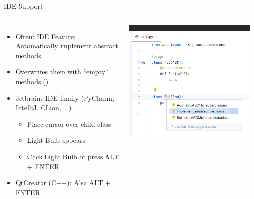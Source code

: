 \begin{frame}{IDE Support}
%
\begin{columns}
\begin{itemize}
\item Often: IDE Feature: Automatically implement abstract methods
\item Overwrites them with \enquote{empty} methods (\thus {})
\item Jetbrains IDE family (PyCharm, IntelliJ, CLion, ...)
	\begin{itemize}
	\item Place cursor over child class
	\item Light Bulb appears
	\item Click Light Bulb or press ALT + ENTER
	\end{itemize}
\item QtCreator (C++): Also ALT + ENTER
\end{itemize}
%
\includegraphics[width=\linewidth]{./gfx/15-IDE_ImplementAbstractMethods}
\end{columns}
%
\end{frame}


